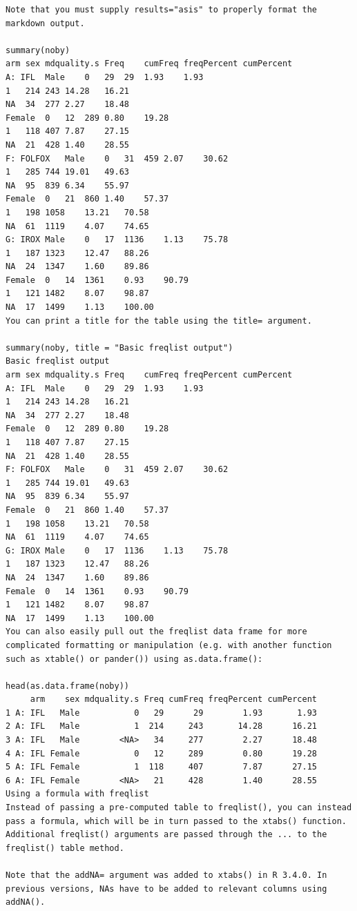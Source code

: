 \documentclass[
]{book}
\begin{document}
\begin{verbatim}
Note that you must supply results="asis" to properly format the markdown output.

summary(noby)
arm sex mdquality.s Freq    cumFreq freqPercent cumPercent
A: IFL  Male    0   29  29  1.93    1.93
1   214 243 14.28   16.21
NA  34  277 2.27    18.48
Female  0   12  289 0.80    19.28
1   118 407 7.87    27.15
NA  21  428 1.40    28.55
F: FOLFOX   Male    0   31  459 2.07    30.62
1   285 744 19.01   49.63
NA  95  839 6.34    55.97
Female  0   21  860 1.40    57.37
1   198 1058    13.21   70.58
NA  61  1119    4.07    74.65
G: IROX Male    0   17  1136    1.13    75.78
1   187 1323    12.47   88.26
NA  24  1347    1.60    89.86
Female  0   14  1361    0.93    90.79
1   121 1482    8.07    98.87
NA  17  1499    1.13    100.00
You can print a title for the table using the title= argument.

summary(noby, title = "Basic freqlist output")
Basic freqlist output
arm sex mdquality.s Freq    cumFreq freqPercent cumPercent
A: IFL  Male    0   29  29  1.93    1.93
1   214 243 14.28   16.21
NA  34  277 2.27    18.48
Female  0   12  289 0.80    19.28
1   118 407 7.87    27.15
NA  21  428 1.40    28.55
F: FOLFOX   Male    0   31  459 2.07    30.62
1   285 744 19.01   49.63
NA  95  839 6.34    55.97
Female  0   21  860 1.40    57.37
1   198 1058    13.21   70.58
NA  61  1119    4.07    74.65
G: IROX Male    0   17  1136    1.13    75.78
1   187 1323    12.47   88.26
NA  24  1347    1.60    89.86
Female  0   14  1361    0.93    90.79
1   121 1482    8.07    98.87
NA  17  1499    1.13    100.00
You can also easily pull out the freqlist data frame for more complicated formatting or manipulation (e.g. with another function such as xtable() or pander()) using as.data.frame():

head(as.data.frame(noby))
     arm    sex mdquality.s Freq cumFreq freqPercent cumPercent
1 A: IFL   Male           0   29      29        1.93       1.93
2 A: IFL   Male           1  214     243       14.28      16.21
3 A: IFL   Male        <NA>   34     277        2.27      18.48
4 A: IFL Female           0   12     289        0.80      19.28
5 A: IFL Female           1  118     407        7.87      27.15
6 A: IFL Female        <NA>   21     428        1.40      28.55
Using a formula with freqlist
Instead of passing a pre-computed table to freqlist(), you can instead pass a formula, which will be in turn passed to the xtabs() function. Additional freqlist() arguments are passed through the ... to the freqlist() table method.

Note that the addNA= argument was added to xtabs() in R 3.4.0. In previous versions, NAs have to be added to relevant columns using addNA().


\end{verbatim}
\end{document}
